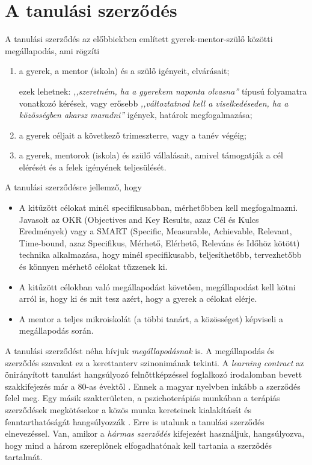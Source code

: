 \section{A tanulási szerződés}

A tanulási szerződés az előbbiekben említett gyerek-mentor-szülő közötti megállapodás, ami rögzíti
\begin{enumerate}
      \item a gyerek, a mentor (iskola) és a szülő igényeit, elvárásait;

            ezek lehetnek: \emph{,,szeretném, ha a gyerekem naponta olvasna''} típusú folyamatra vonatkozó kérések, vagy erősebb \emph{,,változtatnod       kell a viselkedéseden, ha a közösségben akarsz maradni''} igények, határok megfogalmazása;

      \item a gyerek céljait a következő trimeszterre, vagy a tanév végéig;

      \item a gyerek, mentorok (iskola) és szülő vállalásait, amivel támogatják a cél elérését és a felek igényének teljesülését.

\end{enumerate}

A tanulási szerződésre jellemző, hogy
\begin{itemize}
      \item A kitűzött célokat minél specifikusabban, mérhetőbben kell megfogalmazni. Javasolt az OKR  (Objectives and Key Results, azaz	Cél és Kulcs Eredmények) \citep{okr} vagy a SMART (Specific, Measurable, Achievable, Relevant, Time-bound, azaz Specifikus,  Mérhető, Elérhető, Releváns és Időhöz kötött) \citep{wiki:smart} technika alkalmazása, hogy minél specifikusabb, teljesíthetőbb, tervezhetőbb és könnyen mérhető célokat tűzzenek ki.

      \item A kitűzött célokban való megállapodást követően, megállapodást kell kötni arról is, hogy ki és mit tesz azért, hogy a gyerek a célokat elérje.

      \item A mentor a teljes mikroiskolát (a többi tanárt, a közösséget) képviseli a megállapodás során.
\end{itemize}

A tanulási szerződést néha hívjuk \emph{megállapodásnak} is. A megállapodás és szerződés szavakat ez a kerettanterv szinonimának tekinti. A \emph{learn\-ing con\-tract} az önirányított tanulást hangsúlyozó felnőttképzéssel foglalkozó irodalomban bevett szakkifejezés már a 80-as évektől \citep{Malcolm77}. Ennek a magyar nyelvben inkább a szerződés felel meg. Egy másik szakterületen, a pszichoterápiás munkában a terápiás szerződések megkötésekor a közös munka kereteinek kialakítását és fenntarthatóságát hangsúlyozzák \citep{pszichoterapia}. Erre is utalunk a tanulási szerződés elnevezéssel. Van, amikor a \emph{hármas szerződés} kifejezést használjuk, hangsúlyozva, hogy mind a három szereplőnek elfogadhatónak kell tartania a szerződés tartalmát.
